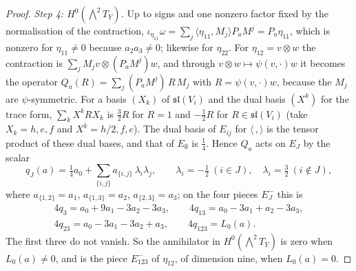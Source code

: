 \documentclass[11pt,reqno]{amsart}
\theoremstyle{plain}
\theoremstyle{definition}
\theoremstyle{remark}
\begin{document}
\begin{proof}
\emph{Step 4: $H^{0}({\textstyle\bigwedge^{2}}T_{Y})$.} Up to signs and one
nonzero factor fixed by the normalisation of the contraction,
$\iota_{\eta_{11}}\omega=\sum_{j}\langle\eta_{11},M_{j}\rangle P_{a}M^{j}=
P_{a}\eta_{11}$, which is nonzero for $\eta_{11}\ne0$ because $a_{2}a_{3}\ne0$;
likewise for $\eta_{22}$. For $\eta_{12}=v\otimes w$ the contraction is
$\sum_{j}M_{j}v\otimes(P_{a}M^{j})w$, and through $v\otimes w\mapsto
\psi(v,\cdot)w$ it becomes the operator $Q_{a}(R)=\sum_{j}(P_{a}M^{j})\,R\,
M_{j}$ with $R=\psi(v,\cdot)w$, because the $M_{j}$ are $\psi$-symmetric.
For a basis $(X_{k})$ of $\mathfrak{sl}(V_{i})$ and the dual basis $(X^{k})$
for the trace form, $\sum_{k}X^{k}RX_{k}$ is $\frac32R$ for $R=1$ and
$-\frac12R$ for $R\in\mathfrak{sl}(V_{i})$ (take $X_{k}=h,e,f$ and $X^{k}=h/2,
f,e$). The dual basis of $E_{ij}$ for $\langle\,,\rangle$ is the tensor
product of these dual bases, and that of $E_{\emptyset}$ is $\frac14$. Hence
$Q_{a}$ acts on $E_{J}$ by the scalar
\[
  q_{J}(a)=\tfrac14a_{0}+\sum_{\{i,j\}}a_{\{i,j\}}\,\lambda_{i}\lambda_{j},
  \qquad\lambda_{i}=-\tfrac12\ (i\in J),\quad\lambda_{i}=\tfrac32\
  (i\notin J),
\]
where $a_{\{1,2\}}=a_{1}$, $a_{\{1,3\}}=a_{2}$, $a_{\{2,3\}}=a_{3}$; on the four
pieces $E_{J}^{-}$ this is
\begin{gather*}
  4q_{3}=a_{0}+9a_{1}-3a_{2}-3a_{3},\qquad
  4q_{13}=a_{0}-3a_{1}+a_{2}-3a_{3},\\
  4q_{23}=a_{0}-3a_{1}-3a_{2}+a_{3},\qquad
  4q_{123}=L_{0}(a).
\end{gather*}
The first three do not vanish. So the annihilator in
$H^{0}({\textstyle\bigwedge^{2}}T_{Y})$ is zero when $L_{0}(a)\ne0$, and is the
piece $E_{123}^{-}$ of $\eta_{12}$, of dimension nine, when $L_{0}(a)=0$.


\end{proof}
\end{document}
